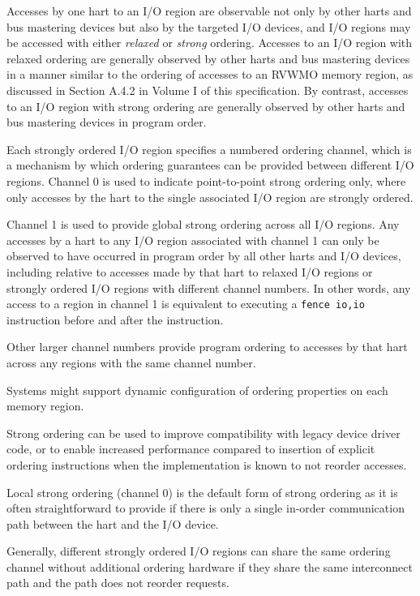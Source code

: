Accesses by one hart to an I/O region are observable not only by other harts
and bus mastering devices but also by the targeted I/O devices, and I/O
regions may be accessed with either {\em relaxed} or {\em strong} ordering.
Accesses to an I/O region with relaxed ordering are generally observed by
other harts and bus mastering devices in a manner similar to the ordering of
accesses to an RVWMO memory region, as discussed in Section A.4.2 in Volume
I of this specification.
By contrast, accesses to an I/O region with strong ordering are generally
observed by other harts and bus mastering devices in program order.

Each strongly ordered I/O region specifies a numbered ordering
channel, which is a mechanism by which ordering guarantees can be
provided between different I/O regions.  Channel 0 is used to indicate
point-to-point strong ordering only, where only accesses by the hart to the
single associated I/O region are strongly ordered.

Channel 1 is used to provide global strong ordering across all I/O
regions.  Any accesses by a hart to any I/O region associated with
channel 1 can only be observed to have occurred in program order by all
other harts and I/O devices, including relative to accesses made by
that hart to relaxed I/O regions or strongly ordered I/O regions with
different channel numbers.  In other words, any access to a region in
channel 1 is equivalent to executing a {\tt fence io,io}
instruction before and after the instruction.

Other larger channel numbers provide program ordering to accesses by
that hart across any regions with the same channel number.

Systems might support dynamic configuration of ordering properties on
each memory region.

\begin{commentary}
Strong ordering can be used to improve compatibility with legacy
device driver code, or to enable increased performance compared to
insertion of explicit ordering instructions when the implementation is
known to not reorder accesses.

Local strong ordering (channel 0) is the default form of strong
ordering as it is often straightforward to provide if there is only a
single in-order communication path between the hart and the I/O
device.

Generally, different strongly ordered I/O regions can share the same
ordering channel without additional ordering hardware if they share
the same interconnect path and the path does not reorder requests.
\end{commentary}

